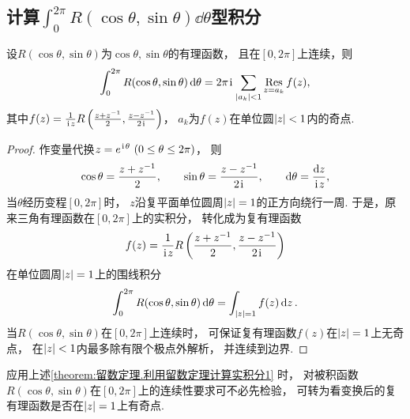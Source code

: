 \subsection{计算\texorpdfstring{\(\int_0^{2\pi} R(\cos\theta,\sin\theta) \dd{\theta}\)型}{在[0,2π]区间上的含有三角函数的}积分}
\begin{theorem}\label{theorem:留数定理.利用留数定理计算实积分1}
设\(R(\cos\theta,\sin\theta)\)为\(\cos\theta,\sin\theta\)的有理函数，
且在\([0,2\pi]\)上连续，则\begin{equation*}
	\int_0^{2\pi} R(\cos\theta,\sin\theta) \dd{\theta}
	= 2\pi\kern1pt\mathrm{i}\kern1pt \sum_{\abs{a_k}<1} \operatorname*{Res}_{z=a_k} f(z),
\end{equation*}
其中\(f(z) = \frac{1}{\kern1pt\mathrm{i}\kern1pt z} R\left(\frac{z+z^{-1}}{2},\frac{z-z^{-1}}{2\kern1pt\mathrm{i}\kern1pt}\right)\)，
\(a_k\)为\(f(z)\)在单位圆\(\abs{z}<1\)内的奇点.
\begin{proof}
作变量代换\(z = e^{\kern1pt\mathrm{i}\kern1pt\theta}\ (0\leq\theta\leq2\pi)\)，
则\begin{equation*}
	\cos\theta = \frac{z+z^{-1}}{2},
	\qquad
	\sin\theta = \frac{z-z^{-1}}{2\kern1pt\mathrm{i}\kern1pt},
	\qquad
	\dd{\theta} = \frac{\dd{z}}{\kern1pt\mathrm{i}\kern1pt z},
\end{equation*}
当\(\theta\)经历变程\([0,2\pi]\)时，
\(z\)沿复平面单位圆周\(\abs{z}=1\)的正方向绕行一周.
于是，原来三角有理函数在\([0,2\pi]\)上的实积分，
转化成为复有理函数\begin{equation*}
	f(z) = \frac{1}{\kern1pt\mathrm{i}\kern1pt z} R\left(\frac{z+z^{-1}}{2},\frac{z-z^{-1}}{2\kern1pt\mathrm{i}\kern1pt}\right)
\end{equation*}在单位圆周\(\abs{z}=1\)上的围线积分\begin{equation*}
	\int_0^{2\pi} R(\cos\theta,\sin\theta) \dd{\theta}
	= \int_{\abs{z}=1} f(z) \dd{z}.
\end{equation*}
当\(R(\cos\theta,\sin\theta)\)在\([0,2\pi]\)上连续时，
可保证复有理函数\(f(z)\)在\(\abs{z}=1\)上无奇点，
在\(\abs{z}<1\)内最多除有限个极点外解析，
并连续到边界.
\end{proof}
\end{theorem}

应用上述\cref{theorem:留数定理.利用留数定理计算实积分1} 时，
对被积函数\(R(\cos\theta,\sin\theta)\)在\([0,2\pi]\)上的连续性要求可不必先检验，
可转为看变换后的复有理函数是否在\(\abs{z}=1\)上有奇点.

